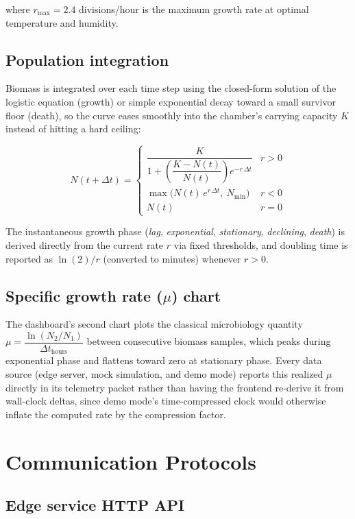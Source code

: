 \documentclass[11pt]{article}
\begin{document}
where \(r_{\max} = 2.4\) divisions/hour is the maximum growth rate at optimal temperature and humidity.

\subsection{Population integration}

Biomass is integrated over each time step using the closed-form solution of the logistic equation (growth) or simple exponential decay toward a small survivor floor (death), so the curve eases smoothly into the chamber's carrying capacity \(K\) instead of hitting a hard ceiling:

\[
N(t + \Delta t) = \begin{cases}
\dfrac{K}{1 + \left(\dfrac{K - N(t)}{N(t)}\right) e^{-r\,\Delta t}} & r > 0 \\[10pt]
\max\!\big(N(t)\, e^{r\,\Delta t},\ N_{\min}\big) & r < 0 \\[4pt]
N(t) & r = 0
\end{cases}
\]

The instantaneous growth phase (\emph{lag}, \emph{exponential}, \emph{stationary}, \emph{declining}, \emph{death}) is derived directly from the current rate \(r\) via fixed thresholds, and doubling time is reported as \(\ln(2)/r\) (converted to minutes) whenever \(r > 0\).

\subsection{Specific growth rate (\(\mu\)) chart}

The dashboard's second chart plots the classical microbiology quantity \(\mu = \dfrac{\ln(N_2/N_1)}{\Delta t_{\text{hours}}}\) between consecutive biomass samples, which peaks during exponential phase and flattens toward zero at stationary phase. Every data source (edge server, mock simulation, and demo mode) reports this realized \(\mu\) directly in its telemetry packet rather than having the frontend re-derive it from wall-clock deltas, since demo mode's time-compressed clock would otherwise inflate the computed rate by the compression factor.

\section{Communication Protocols}

\subsection{Edge service HTTP API}
\end{document}
